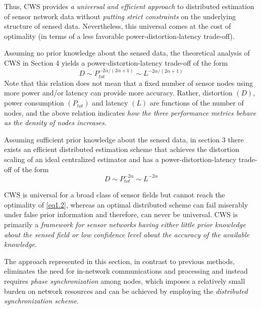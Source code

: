 Thus, CWS provides \emph{a universal and efficient approach} to distributed estimation of sensor network data without \emph{\textcolor[rgb]{0,0,1}{putting strict constraints}} on the underlying structure of sensed data. Nevertheless, this universal comes at the cost of optimality (in terms of a less favorable power-distortion-latency trade-off). 

Assuming no prior knowledge about the sensed data, the theoretical analysis of CWS in Section 4 yields a power-distortion-latency trade-off of the form
\begin{equation}
    D \sim P_{tot}^{-2 \alpha/(2\alpha + 1)} \sim L^{-2\alpha/(2\alpha + 1)}
    \label{eq1.1}
\end{equation}
Note that this relation does not mean that a fixed number of sensor nodes using more power and/or latency can provide more accuracy. Rather, distortion $(D)$, power consumption $(P_{tot})$ and latency $(L)$ are functions of the number of nodes, and the above relation indicates \emph{\textcolor[rgb]{1,0,0}{how the three performance metrics behave as the density of nodes increases}}.

Assuming sufficient prior knowledge about the sensed data, in section 3 there exists an efficient distributed estimation scheme that achieves the distortion scaling of an ideal centralized estimator and has a power-distortion-latency trade-off of the form
\begin{equation}
    D \sim P_{tot}^{-2\alpha} \sim L^{-2\alpha}
    \label{eq1.2}
\end{equation}

CWS is universal for a broad class of sensor fields but cannot reach the optimality of \cref{eq1.2}, whereas an optimal distributed scheme can fail miserably under false prior information and therefore, can never be universal. CWS is primarily a \emph{\textcolor[rgb]{1,0,0}{framework for sensor networks having either little prior knowledge about the sensed field or low confidence level about the accuracy of the available knowledge}}.

The approach represented in this section, in contrast to previous methods, eliminates the need for in-network communications and processing and instead requires \emph{\textcolor[rgb]{1,0,0}{phase synchronization}} among nodes, which imposes a relatively small burden on network resources and can be achieved by employing the \emph{\textcolor[rgb]{1,0,0}{distributed synchronization scheme}}. 

